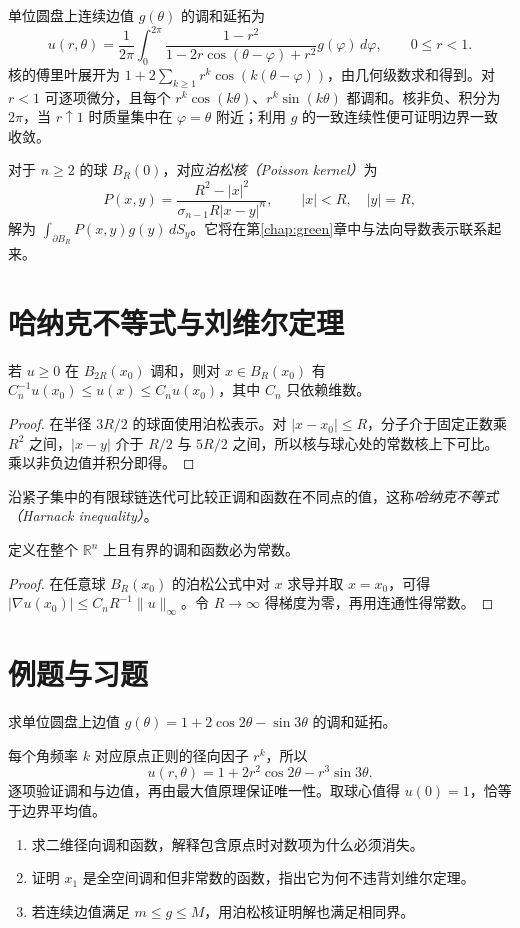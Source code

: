 单位圆盘上连续边值 $g(\theta)$ 的调和延拓为
\begin{equation}
 u(r,\theta)=\frac1{2\pi}\int_0^{2\pi}
 \frac{1-r^2}{1-2r\cos(\theta-\varphi)+r^2}g(\varphi)\,d\varphi,
 \qquad 0\le r<1.
 \label{eq:poisson-disk}
\end{equation}
核的傅里叶展开为 $1+2\sum_{k\ge1}r^k\cos(k(\theta-\varphi))$，由几何级数求和得到。对 $r<1$ 可逐项微分，且每个 $r^k\cos(k\theta)$、$r^k\sin(k\theta)$ 都调和。核非负、积分为 $2\pi$，当 $r\uparrow1$ 时质量集中在 $\varphi=\theta$ 附近；利用 $g$ 的一致连续性便可证明边界一致收敛。

对于 $n\ge2$ 的球 $B_R(0)$，对应\emph{泊松核（Poisson kernel）}为
\[
 P(x,y)=\frac{R^2-|x|^2}{\sigma_{n-1}R|x-y|^n},\qquad |x|<R,\quad |y|=R,
\]
解为 $\int_{\partial B_R}P(x,y)g(y)\,dS_y$。它将在第\ref{chap:green}章中与法向导数表示联系起来。

\section{哈纳克不等式与刘维尔定理}
\begin{proposition}[哈纳克不等式的局部形式]
若 $u\ge0$ 在 $B_{2R}(x_0)$ 调和，则对 $x\in B_R(x_0)$ 有 $C_n^{-1}u(x_0)\le u(x)\le C_nu(x_0)$，其中 $C_n$ 只依赖维数。
\end{proposition}
\begin{proof}
在半径 $3R/2$ 的球面使用泊松表示。对 $|x-x_0|\le R$，分子介于固定正数乘 $R^2$ 之间，$|x-y|$ 介于 $R/2$ 与 $5R/2$ 之间，所以核与球心处的常数核上下可比。乘以非负边值并积分即得。
\end{proof}
沿紧子集中的有限球链迭代可比较正调和函数在不同点的值，这称\emph{哈纳克不等式（Harnack inequality）}。

\begin{theorem}[刘维尔定理]
定义在整个 $\mathbb R^n$ 上且有界的调和函数必为常数。
\end{theorem}
\begin{proof}
在任意球 $B_R(x_0)$ 的泊松公式中对 $x$ 求导并取 $x=x_0$，可得 $|\nabla u(x_0)|\le C_nR^{-1}\|u\|_\infty$。令 $R\to\infty$ 得梯度为零，再用连通性得常数。
\end{proof}

\section{例题与习题}
\begin{example}
求单位圆盘上边值 $g(\theta)=1+2\cos2\theta-\sin3\theta$ 的调和延拓。
\end{example}
\begin{solve}
每个角频率 $k$ 对应原点正则的径向因子 $r^k$，所以
\[
 u(r,\theta)=1+2r^2\cos2\theta-r^3\sin3\theta.
\]
逐项验证调和与边值，再由最大值原理保证唯一性。取球心值得 $u(0)=1$，恰等于边界平均值。
\end{solve}
\begin{enumerate}
 \item 求二维径向调和函数，解释包含原点时对数项为什么必须消失。
 \item 证明 $x_1$ 是全空间调和但非常数的函数，指出它为何不违背刘维尔定理。
 \item 若连续边值满足 $m\le g\le M$，用泊松核证明解也满足相同界。
\end{enumerate}

